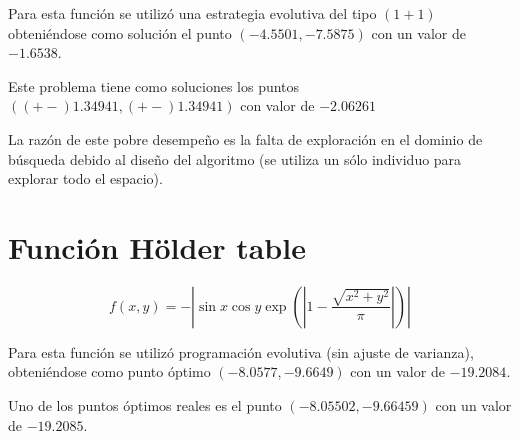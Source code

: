 \documentclass[10pt,letterpaper]{article}
\begin{document}
Para esta función se utilizó una estrategia evolutiva del tipo $(1+1)$ obteniéndose como solución el punto $(-4.5501,-7.5875)$ con un valor de $-1.6538$.

Este problema tiene como soluciones los puntos $((+-) 1.34941, (+-) 1.34941)$ con valor de $-2.06261$

La razón de este pobre desempeño es la falta de exploración en el dominio de búsqueda debido al diseño del algoritmo (se utiliza un sólo individuo para explorar todo el espacio).

\section{Función Hölder table}
$$f(x,y) = -\left| \sin x \cos y \exp{  \left( \left| 1 - 
\dfrac{ \sqrt{x^2 + y^2}  }{ \pi } \right| \right) } \right| $$

Para esta función se utilizó programación evolutiva (sin ajuste de varianza), obteniéndose como punto óptimo $(-8.0577,-9.6649)$ con un valor de $-19.2084$.

Uno de los puntos óptimos reales es el punto $(-8.05502,-9.66459)$ con un valor de $-19.2085$.
\end{document}

